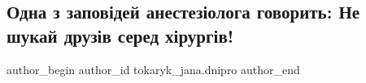  
 
 
 
 

\subsection{Одна з заповідей анестезіолога говорить: Не шукай друзів серед хірургів!}
\label{sec:28_12_2022.fb.tokaryk_jana.dnipro.1.odna_z_zapov_dei_ane}

\ifcmt
 author_begin
   author_id tokaryk_jana.dnipro
 author_end
\fi
